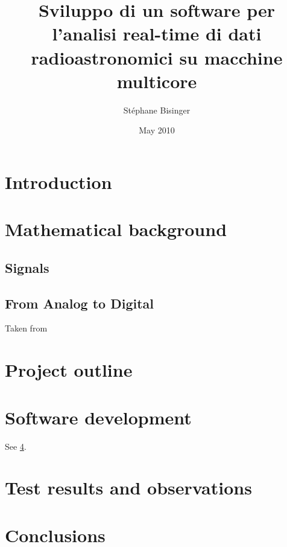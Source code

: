 \documentclass[a4paper,11pt,twoside,openright]{unibo}
\begin{document}
\title{Sviluppo di un software per l'analisi real-time di dati
radioastronomici su macchine multicore}
\author{St\'ephane Bisinger}
\date{May 2010}

\maketitle
%

\tableofcontents

\chapter*{Introduction}
\label{intro}
\chapter{Mathematical background}
\label{math_bkg}
\section{Signals}
\section{From Analog to Digital}
Taken from \cite{bertoni}
\chapter{Project outline}
\label{outline}
\chapter{Software development}
\label{sw_devel}
See \ref{tests}.
\chapter{Test results and observations}
\label{tests}
\chapter{Conclusions}
\label{conclusions}


\end{document}
